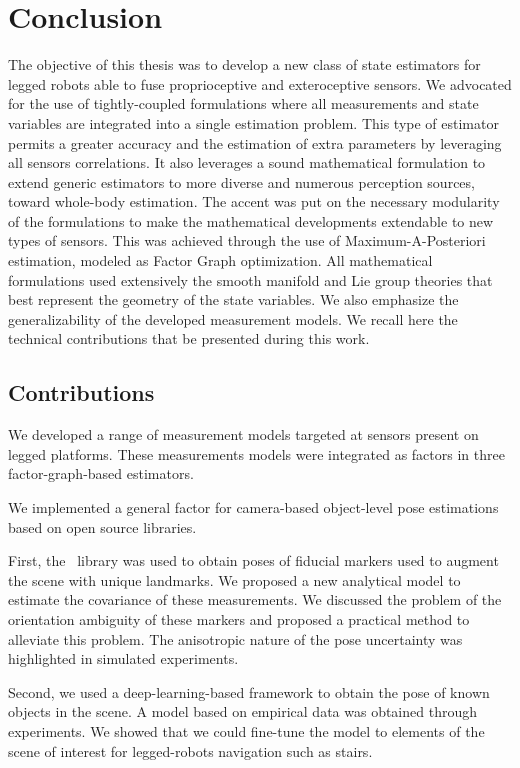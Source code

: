 \chapter{Conclusion}

The objective of this thesis was to develop a new class of state estimators for legged robots able to fuse proprioceptive and exteroceptive
sensors. We advocated for the use of tightly-coupled formulations where all measurements and state variables are integrated into a single estimation 
problem. This type of estimator permits a greater accuracy and the estimation of extra parameters by leveraging all sensors correlations.
It also leverages a sound mathematical formulation to extend generic estimators to more diverse and numerous perception sources, toward whole-body estimation.
The accent was put on the necessary modularity of the formulations to make the mathematical developments extendable to new types of sensors. This 
was achieved through the use of Maximum-A-Posteriori estimation, modeled as Factor Graph optimization. All mathematical formulations used extensively the smooth manifold
and Lie group theories that best represent the geometry of the state variables. We also emphasize the generalizability of the developed measurement models. 
We recall here the technical contributions that be presented during this work.

\section{Contributions}

We developed a range of measurement models targeted at sensors present on legged platforms. These measurements models were integrated as factors in 
three factor-graph-based estimators.

\bigskip

We implemented a general factor for camera-based object-level pose estimations based on open source libraries. 

First, the \apriltag\ library was used 
to obtain poses of fiducial markers used to augment the scene with unique landmarks. We proposed a new analytical model to estimate the covariance of 
these measurements. We discussed the problem of the orientation ambiguity of these markers and proposed a practical method to alleviate this problem.
The anisotropic nature of the pose uncertainty was highlighted in simulated experiments. 

Second, we used a deep-learning-based framework to obtain the pose of known objects in the scene. A model based on empirical data was obtained through
experiments. We showed that we could fine-tune the model to elements of the scene of interest for legged-robots navigation such as stairs.

